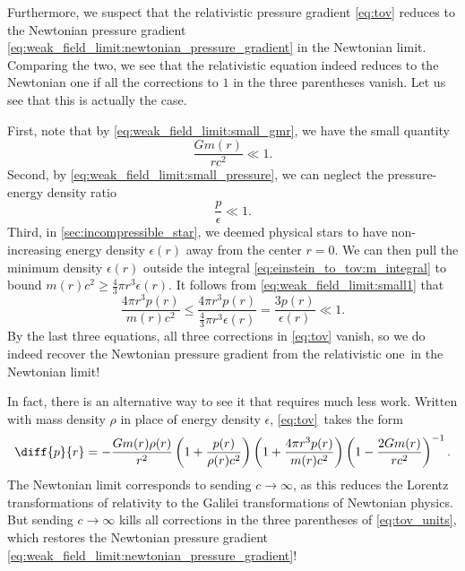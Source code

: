 Furthermore, we suspect that the relativistic pressure gradient \eqref{eq:tov} reduces to the Newtonian pressure gradient \eqref{eq:weak_field_limit:newtonian_pressure_gradient} in the Newtonian limit.
Comparing the two, we see that the relativistic equation indeed reduces to the Newtonian one if all the corrections to $1$ in the three parentheses vanish.
Let us see that this is actually the case.

First, note that by \cref{eq:weak_field_limit:small_gmr}, we have the small quantity
\begin{equation}
	\frac{Gm(r)}{rc^2} \ll 1 .
	\label{eq:weak_field_limit:small3}
\end{equation}
Second, by \cref{eq:weak_field_limit:small_pressure}, we can neglect the pressure-energy density ratio
\begin{equation}
	\frac{p}{\epsilon} \ll 1 .
	\label{eq:weak_field_limit:small1}
\end{equation}
Third, in \cref{sec:incompressible_star}, we deemed physical stars to have non-increasing energy density $\epsilon(r)$ away from the center $r=0$.
We can then pull the minimum density $\epsilon(r)$ outside the integral \eqref{eq:einstein_to_tov:m_integral} to bound $m(r) c^2 \geq \frac{4}{3} \pi r^3 \epsilon(r)$.
It follows from \cref{eq:weak_field_limit:small1} that
\begin{equation}
	\frac{4 \pi r^3 p(r)}{m(r) c^2} \leq \frac{4 \pi r^3 p(r)}{\frac{4}{3} \pi r^3 \epsilon(r)}
	                                =    \frac{3 p(r)}{\epsilon(r)}
						            \ll  1 .
	\label{eq:weak_field_limit:small2}
\end{equation}
By the last three equations, all three corrections in \cref{eq:tov} vanish, so we do indeed recover the Newtonian pressure gradient from the relativistic one in the Newtonian limit!

In fact, there is an alternative way to see it that requires much less work.
Written with mass density $\rho$ in place of energy density $\epsilon$, \cref{eq:tov} takes the form
\begin{equation}
	\diff{p}{r} = -\frac{G m(r) \rho(r)}{r^2} \left( 1 + \frac{p(r)}{\rho(r) c^2} \right) \left( 1 + \frac{4 \pi r^3 p(r)}{m(r) c^2} \right) \left( 1 - \frac{2 G m(r)}{r c^2} \right)^{-1} .
	\label{eq:tov_units}
\end{equation}
The Newtonian limit corresponds to sending $c \rightarrow \infty$, as this reduces the Lorentz transformations of relativity to the Galilei transformations of Newtonian physics.
But sending $c \rightarrow \infty$ kills all corrections in the three parentheses of \cref{eq:tov_units}, which restores the Newtonian pressure gradient \eqref{eq:weak_field_limit:newtonian_pressure_gradient}!
